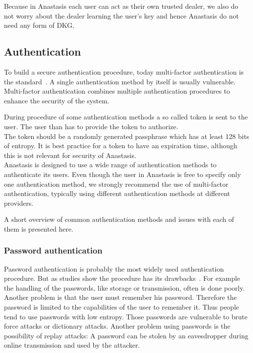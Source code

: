 Because in Anastasis each user can act as their own trusted dealer, we
also do not worry about the dealer learning the user's key and hence
Anastasis do not need any form of DKG.

\subsection{Authentication} \label{sec:rel:authentication}

To build a secure authentication procedure, today multi-factor
authentication is the standard~\cite{multifactor_authentication}. A
single authentication method by itself is usually vulnerable.
Multi-factor authentication combines multiple authentication
procedures to enhance the security of the system.

During procedure of some authentication methods a so called token is 
sent to the user. The user than has to provide the token to authorize.\\
The token should be a randomly generated passphrase which has at 
least 128 bits of entropy. It is best practice for a token to have an 
expiration time, although this is not relevant for security of Anastasis.\\

Anastasis is designed to use a wide range of authentication methods to
authenticate its users. Even though the user in Anastasis is free to
specify only one authentication method, we strongly recommend the use
of multi-factor authentication, typically using different
authentication methods at different providers.

A short overview of common authentication methods and issues with
each of them is presented here.

\subsubsection{Password authentication}

Password authentication is probably the most widely used
authentication procedure. But as studies show the procedure has its
drawbacks~\cite{authentication_methods_review}. For example the
handling of the passwords, like storage or transmission, often is done
poorly. Another problem is that the user must remember his
password. Therefore the password is limited to the capabilities of the
user to remember it. Thus people tend to use passwords with low
entropy. Those passwords are vulnerable to brute force attacks or
dictionary attacks. Another problem using passwords is the possibility
of replay attacks: A password can be stolen by an eavesdropper during
online transmission and used by the attacker.

